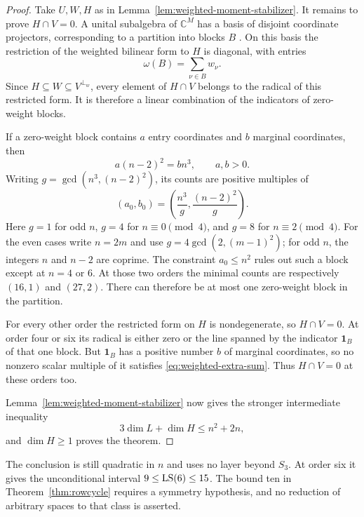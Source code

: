 \begin{proof}
Take $U,W,H$ as in Lemma~\ref{lem:weighted-moment-stabilizer}.
It remains to prove $H\cap V=0$.
A unital subalgebra of $\mathbb C^M$ has a basis of disjoint
coordinate projectors, corresponding to a partition into blocks
$B$ \citep[Lemma~2.7, p.~5]{MZ}.
On this basis the restriction of the weighted bilinear form to $H$
is diagonal, with entries
\[
 \omega(B)=\sum_{\nu\in B}w_\nu.
\]
Since $H\subseteq W\subseteq V^{\perp_w}$, every element of
$H\cap V$ belongs to the radical of this restricted form.
It is therefore a linear combination of the indicators of
zero-weight blocks.

If a zero-weight block contains $a$ entry coordinates and $b$
marginal coordinates, then
\[
 a(n-2)^2=bn^3,\qquad a,b>0.
\]
Writing $g=\gcd(n^3,(n-2)^2)$, its counts are positive multiples of
\[
 (a_0,b_0)=
 \left(\frac{n^3}{g},\frac{(n-2)^2}{g}\right).
\]
Here $g=1$ for odd $n$, $g=4$ for $n\equiv0\pmod4$, and $g=8$
for $n\equiv2\pmod4$. For the even cases write $n=2m$ and use $g=4\gcd(2,(m-1)^2)$; for odd $n$, the integers $n$ and $n-2$ are coprime.
The constraint $a_0\le n^2$ rules out such a block except at
$n=4$ or $6$.
At those two orders the minimal counts are respectively
$(16,1)$ and $(27,2)$.
There can therefore be at most one zero-weight block in the
partition.

For every other order the restricted form on $H$ is nondegenerate,
so $H\cap V=0$.
At order four or six its radical is either zero or the line spanned
by the indicator $\mathbf1_B$ of that one block.
But $\mathbf1_B$ has a positive number $b$ of marginal coordinates,
so no nonzero scalar multiple of it satisfies
\eqref{eq:weighted-extra-sum}.
Thus $H\cap V=0$ at these orders too.

Lemma~\ref{lem:weighted-moment-stabilizer} now gives the stronger
intermediate inequality
\[
 3\dim L+\dim H\le n^2+2n,
\]
and $\dim H\ge1$ proves the theorem.
\end{proof}


The conclusion is still quadratic in $n$ and uses no layer beyond $S_3$. At order six it gives the unconditional interval $9\le\operatorname{LS}(6)\le15$. The bound ten in Theorem~\ref{thm:rowcycle} requires a symmetry hypothesis, and no reduction of arbitrary spaces to that class is asserted.

